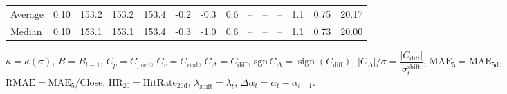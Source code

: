\begin{threeparttable}
{\begin{tabular}{lrrrrrrrrrrrrr}
Average &     0.10 & 153.2 & 153.2 & 153.4 &       -0.2 &                     -0.3 &                 0.6 &         -- &        -- &             -- &              1.1 &            0.75 &                  20.17 \\
 Median &     0.10 & 153.1 & 153.1 & 153.4 &       -0.3 &                     -1.0 &                 0.6 &         -- &        -- &             -- &              1.1 &            0.73 &                  20.00 \\
\bottomrule
\end{tabular}
}
\begin{tablenotes}\footnotesize
\item $\kappa=\kappa(\sigma)$, $B=B_{t-1}$, $C_p=C_{\text{pred}}$, $C_r=C_{\text{real}}$, $C_\Delta=C_{\text{diff}}$, $\mathrm{sgn}\,C_\Delta=\operatorname{sign}(C_{\text{diff}})$, $|C_\Delta|/\sigma=\dfrac{|C_{\text{diff}}|}{\sigma_t^{\text{shift}}}$, $\mathrm{MAE}_5=\mathrm{MAE}_{5\text{d}}$, $\mathrm{RMAE}= \mathrm{MAE}_5 / \text{Close}$, $\mathrm{HR}_{20}=\mathrm{HitRate}_{20\text{d}}$, 
$\lambda_{\text{shift}}=\lambda_t$, 
$\Delta\alpha_t=\alpha_t-\alpha_{t-1}$.
\end{tablenotes}
\end{threeparttable}
\endgroup

